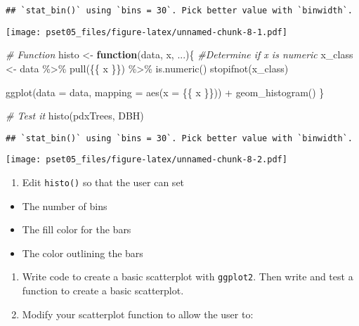 \documentclass[
]{article}
\newenvironment{Shaded}{\begin{snugshade}}{\end{snugshade}}
\newcommand{\AttributeTok}[1]{\textcolor[rgb]{0.77,0.63,0.00}{#1}}
\newcommand{\CommentTok}[1]{\textcolor[rgb]{0.56,0.35,0.01}{\textit{#1}}}
\newcommand{\ControlFlowTok}[1]{\textcolor[rgb]{0.13,0.29,0.53}{\textbf{#1}}}
\newcommand{\FunctionTok}[1]{\textcolor[rgb]{0.00,0.00,0.00}{#1}}
\newcommand{\NormalTok}[1]{#1}
\newcommand{\OtherTok}[1]{\textcolor[rgb]{0.56,0.35,0.01}{#1}}
\newcommand{\SpecialCharTok}[1]{\textcolor[rgb]{0.00,0.00,0.00}{#1}}
\providecommand{\tightlist}{%
  \setlength{\itemsep}{0pt}\setlength{\parskip}{0pt}}
\begin{document}
\begin{verbatim}
## `stat_bin()` using `bins = 30`. Pick better value with `binwidth`.
\end{verbatim}

\texttt{[image: pset05\_files/figure-latex/unnamed-chunk-8-1.pdf]}

\begin{Shaded}
\begin{Highlighting}[]
\CommentTok{\# Function}
\NormalTok{histo }\OtherTok{\textless{}{-}} \ControlFlowTok{function}\NormalTok{(data, x, ...)\{}
  \CommentTok{\#Determine if x is numeric}
\NormalTok{  x\_class }\OtherTok{\textless{}{-}}\NormalTok{ data }\SpecialCharTok{\%\textgreater{}\%}
    \FunctionTok{pull}\NormalTok{(\{\{ x \}\}) }\SpecialCharTok{\%\textgreater{}\%}
    \FunctionTok{is.numeric}\NormalTok{()}
  \FunctionTok{stopifnot}\NormalTok{(x\_class)}
  
  \FunctionTok{ggplot}\NormalTok{(}\AttributeTok{data =}\NormalTok{ data, }\AttributeTok{mapping =} \FunctionTok{aes}\NormalTok{(}\AttributeTok{x =}\NormalTok{ \{\{ x \}\})) }\SpecialCharTok{+}
    \FunctionTok{geom\_histogram}\NormalTok{()}
\NormalTok{\}}

\CommentTok{\# Test it}
\FunctionTok{histo}\NormalTok{(pdxTrees, DBH)}
\end{Highlighting}
\end{Shaded}

\begin{verbatim}
## `stat_bin()` using `bins = 30`. Pick better value with `binwidth`.
\end{verbatim}

\texttt{[image: pset05\_files/figure-latex/unnamed-chunk-8-2.pdf]}

\begin{enumerate}
\def\labelenumi{\alph{enumi}.}
\tightlist
\item
  Edit \texttt{histo()} so that the user can set
\end{enumerate}

\begin{itemize}
\tightlist
\item
  The number of bins
\item
  The fill color for the bars
\item
  The color outlining the bars
\end{itemize}

\begin{enumerate}
\def\labelenumi{\alph{enumi}.}
\setcounter{enumi}{1}
\item
  Write code to create a basic scatterplot with \texttt{ggplot2}. Then
  write and test a function to create a basic scatterplot.
\item
  Modify your scatterplot function to allow the user to:
\end{enumerate}
\end{document}
